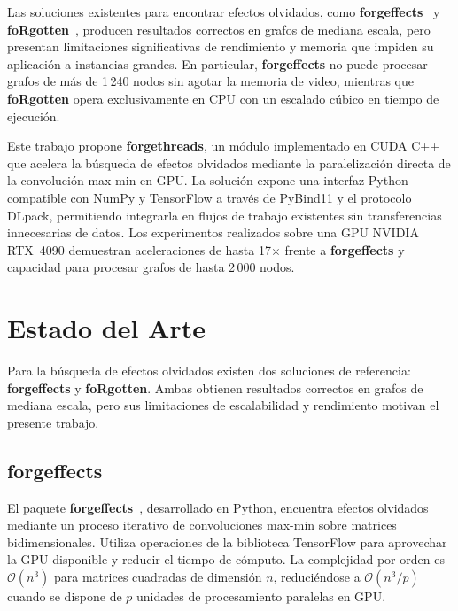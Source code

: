 \documentclass[conference]{IEEEtran}
\begin{document}
Las soluciones existentes para encontrar efectos olvidados, como \textbf{forgeffects}~\cite{claudio} y \textbf{foRgotten}~\cite{elliott}, producen resultados correctos en grafos de mediana escala, pero presentan limitaciones significativas de rendimiento y memoria que impiden su aplicación a instancias grandes. En particular, \textbf{forgeffects} no puede procesar grafos de más de 1\,240 nodos sin agotar la memoria de video, mientras que \textbf{foRgotten} opera exclusivamente en CPU con un escalado cúbico en tiempo de ejecución.

Este trabajo propone \textbf{forgethreads}, un módulo implementado en CUDA C++ que acelera la búsqueda de efectos olvidados mediante la paralelización directa de la convolución max-min en GPU. La solución expone una interfaz Python compatible con NumPy y TensorFlow a través de PyBind11 y el protocolo DLpack, permitiendo integrarla en flujos de trabajo existentes sin transferencias innecesarias de datos. Los experimentos realizados sobre una GPU NVIDIA RTX~4090 demuestran aceleraciones de hasta 17$\times$ frente a \textbf{forgeffects} y capacidad para procesar grafos de hasta 2\,000 nodos.

\section{Estado del Arte}
\label{sec:soa}

Para la búsqueda de efectos olvidados existen dos soluciones de referencia: \textbf{forgeffects} y \textbf{foRgotten}. Ambas obtienen resultados correctos en grafos de mediana escala, pero sus limitaciones de escalabilidad y rendimiento motivan el presente trabajo.

\subsection{forgeffects}

El paquete \textbf{forgeffects}~\cite{claudio}, desarrollado en Python, encuentra efectos olvidados mediante un proceso iterativo de convoluciones max-min sobre matrices bidimensionales. Utiliza operaciones de la biblioteca TensorFlow para aprovechar la GPU disponible y reducir el tiempo de cómputo. La complejidad por orden es $\mathcal{O}(n^3)$ para matrices cuadradas de dimensión $n$, reduciéndose a $\mathcal{O}(n^3/p)$ cuando se dispone de $p$ unidades de procesamiento paralelas en GPU.
\end{document}
